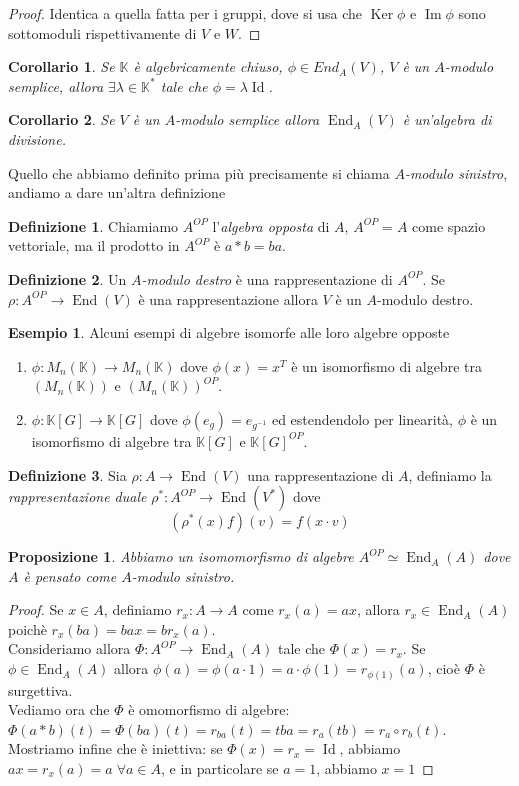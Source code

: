 \documentclass[11pt]{article}
\theoremstyle{plain}
\newtheorem{prop}[thm]{Proposizione}
\newtheorem*{cor}{Corollario}
\theoremstyle{definition}
\newtheorem{defn}{Definizione}[section]
\newtheorem{exmp}{Esempio}[section]
\theoremstyle{remark}
\newcommand{\K}{\mathbb{K}}
\DeclareMathOperator{\End}{End}
\DeclareMathOperator{\Ker}{Ker}
\DeclareMathOperator{\Imm}{Im}
\DeclareMathOperator{\Id}{Id}
\DeclareMathOperator{\iso}{\simeq}
\begin{document}
	\begin{proof}
		Identica a quella fatta per i gruppi, dove si usa che $\Ker \phi$ e $\Imm \phi$ sono sottomoduli rispettivamente di $V$ e $W$.
	\end{proof}
	\begin{cor}
		Se $\K$ è algebricamente chiuso, $\phi\in End_A(V)$, $V$ è un $A$-modulo semplice, allora $\exists \lambda \in \K^*$ tale che $\phi = \lambda \Id$.
	\end{cor}
	\begin{cor}
		Se $V$ è un $A$-modulo semplice allora $\End_A(V)$ è un'algebra di divisione.
	\end{cor}
	Quello che abbiamo definito prima più precisamente si chiama \textit{$A$-modulo sinistro}, andiamo a dare un'altra definizione
	\begin{defn}
		Chiamiamo $A^{OP}$ l'\textit{algebra opposta} di $A$, $A^{OP}=A$ come spazio vettoriale, ma il prodotto in $A^{OP}$ è $a*b = ba$.
	\end{defn}
	\begin{defn}
		Un \textit{$A$-modulo destro} è una rappresentazione di $A^{OP}$. Se $\rho:A^{OP}\to \End(V)$ è una rappresentazione allora $V$ è un $A$-modulo destro.
	\end{defn}
	\begin{exmp}
		Alcuni esempi di algebre isomorfe alle loro algebre opposte
		\begin{enumerate}
			\item $\phi:M_n(\K) \to M_n(\K)$ dove $\phi(x)= x^T$ è un isomorfismo di algebre tra $\left(M_n(\K) \right)$ e $\left( M_n(\K) \right)^{OP}$.
			\item $\phi:\K[G]\to \K[G]$ dove $\phi(e_g)=e_{g^{-1}}$ ed estendendolo per linearità, $\phi$ è un isomorfismo di algebre tra $\K[G]$ e $\K[G]^{OP}$.
		\end{enumerate}
	\end{exmp}
	\begin{defn} Sia $\rho:A\to \End(V)$ una rappresentazione di $A$, definiamo la \textit{rappresentazione duale} $\rho^*:A^{OP}\to \End(V^*)$ dove
	\[
		(\rho^*(x)f)(v) = f(x\cdot v)
	\]
	\end{defn}
	\begin{prop}
		Abbiamo un isomomorfismo di algebre $A^{OP}\iso \End_A(A)$ dove $A$ è pensato come $A$-modulo sinistro.
	\end{prop}
	\begin{proof}
		Se $x\in A$, definiamo $r_x:A\to A$ come $r_x(a)=ax$, allora $r_x\in \End_A(A)$ poichè $r_x(ba)=bax = br_x(a)$.\\
		Consideriamo allora $\Phi:A^{OP}\to\End_A(A)$ tale che $\Phi(x)=r_x$. Se $\phi\in \End_A(A)$ allora $\phi(a)=\phi(a\cdot1)=a\cdot\phi(1) = r_{\phi(1)}(a)$, cioè $\Phi$ è surgettiva.\\
		Vediamo ora che $\Phi$  è omomorfismo di algebre: $\Phi(a\ast b)(t)=\Phi(ba)(t)=r_{ba}(t)=tba=r_a(tb)=r_a\circ r_b (t)$.\\
		Mostriamo infine che è iniettiva: se $\Phi(x)=r_x=\Id$, abbiamo $ax=r_x(a)=a\;\forall a\in A$, e in particolare se $a=1$, abbiamo $x=1$
	\end{proof}
\end{document}
